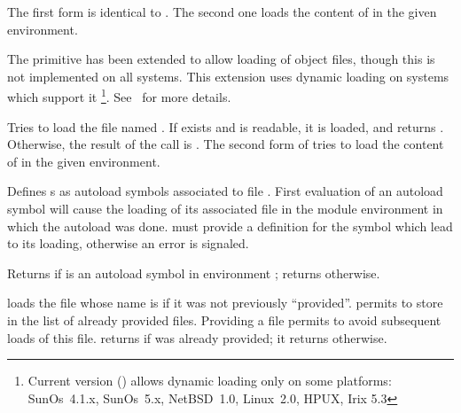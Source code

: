 \begin{entry}{%
}
\saut

The first form is identical to \rrrr{}. The second one loads the
content of  in the given  environment.
\begin{note}
  The  primitive has been extended to allow loading of
  object files, though this is not implemented on all systems.
  This extension uses dynamic loading on systems which support it
  \footnote{Current version (\stkversion) allows dynamic loading
            only on some platforms:  SunOs~4.1.x, SunOs~5.x, NetBSD~1.0, 
            Linux~2.0, HPUX, Irix 5.3}. See~\cite{STkExtension} for more details.
\end{note}
\end{entry}

\begin{entry}{%
}
\saut
Tries to load the file named . If  exists and is
readable, it is loaded, and  returns {\schtrue}. 
Otherwise, the result of the call is {\schfalse}.
The second form of  tries to load the content of  
in the given  environment. 
\end{entry}

\begin{entry}{%
}
\saut
Defines s as autoload symbols associated to file
. 
First evaluation of an autoload symbol will cause the loading of its
associated file in the module environment in which the autoload was done. 
 must provide a definition for the symbol which
lead to its loading, otherwise an error is signaled.
\end{entry}

\begin{entry}{%
}
\saut
Returns {\schtrue} if  is an autoload symbol in  
environment ; returns {\schfalse} otherwise.
\end{entry}

\begin{entry}{%
}
\saut
{} loads the file whose name is  if it was not
previously ``provided''. permits to store  in
the list of already provided files. Providing a file permits to avoid
subsequent loads of this file.  returns {\schtrue} if
 was already provided; it returns {\schfalse} otherwise.
\end{entry}

